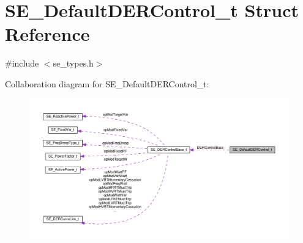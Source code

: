\hypertarget{structSE__DefaultDERControl__t}{}\section{S\+E\+\_\+\+Default\+D\+E\+R\+Control\+\_\+t Struct Reference}
\label{structSE__DefaultDERControl__t}


{\ttfamily \#include $<$se\+\_\+types.\+h$>$}



Collaboration diagram for S\+E\+\_\+\+Default\+D\+E\+R\+Control\+\_\+t\+:\nopagebreak
\begin{figure}[H]
\begin{center}
\leavevmode
\includegraphics[width=350pt]{structSE__DefaultDERControl__t__coll__graph}
\end{center}
\end{figure}
